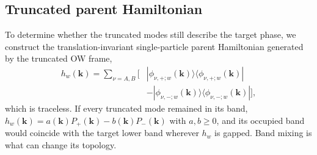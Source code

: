 \documentclass[aps,prb,10pt,twocolumn,superscriptaddress,longbibliography,floatfix]{revtex4-2}
\newcommand{\bk}{\boldsymbol k}
\begin{document}
\subsection{Truncated parent Hamiltonian}
\label{app:TruncatedParent}

To determine whether the truncated modes still describe the target phase, we construct the translation-invariant single-particle parent Hamiltonian generated by the truncated OW frame,
\begin{align}
    h_w(\bk)=\sum_{\nu=A,B}\Big[&|\phi_{\nu,+;w}(\bk)\rangle\langle\phi_{\nu,+;w}(\bk)|\nonumber\\
    &-|\phi_{\nu,-;w}(\bk)\rangle\langle\phi_{\nu,-;w}(\bk)|\Big],
    \label{eq:TruncatedParent}
\end{align}
which is traceless. If every truncated mode remained in its band, $h_w(\bk)=a(\bk)P_+(\bk)-b(\bk)P_-(\bk)$ with $a,b\geq0$, and its occupied band would coincide with the target lower band wherever $h_w$ is gapped. Band mixing is what can change its topology.
\end{document}
